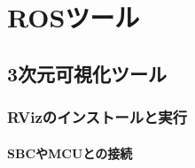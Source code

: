 \vspace{\baselineskip}
\noindent
\begin{description}
\item[]
\end{description}

\chapter{ROSツール}

\section{3次元可視化ツール}

\subsection{RVizのインストールと実行}

\subsubsection{SBCやMCUとの接続}

